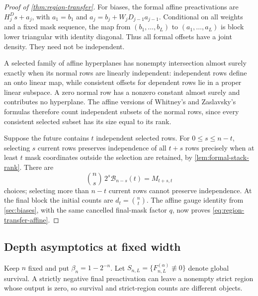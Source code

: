 \begin{proof}[Proof of \cref{thm:region-transfer}]
For biases, the formal affine preactivations are $H_j^Ds+a_j$, with $a_1=b_1$ and $a_j=b_j+W_jD_{j-1}a_{j-1}$. Conditional on all weights and a fixed mask sequence, the map from $(b_1,\ldots,b_L)$ to $(a_1,\ldots,a_L)$ is block lower triangular with identity diagonal. Thus all formal offsets have a joint density. They need not be independent.

A selected family of affine hyperplanes has nonempty intersection almost surely exactly when its normal rows are linearly independent: independent rows define an onto linear map, while consistent offsets for dependent rows lie in a proper linear subspace. A zero normal row has a nonzero constant almost surely and contributes no hyperplane. The affine versions of Whitney's and Zaslavsky's formulas therefore count independent subsets of the normal rows, since every consistent selected subset has its size equal to its rank.

Suppose the future contains $t$ independent selected rows. For $0\le s\le n-t$, selecting $s$ current rows preserves independence of all $t+s$ rows precisely when at least $t$ mask coordinates outside the selection are retained, by \cref{lem:formal-stack-rank}. There are
\[
\binom ns\,2^s\mathcal B_{n-s}(t)=M_{t+s,t}
\]
choices; selecting more than $n-t$ current rows cannot preserve independence. At the final block the initial counts are $d_t=\binom nt$. The affine gauge identity from \cref{sec:biases}, with the same cancelled final-mask factor $q$, now proves \cref{eq:region-transfer-affine}.
\end{proof}

\subsection{Depth asymptotics at fixed width}
\label{sec:fixed-width-depth}

Keep $n$ fixed and put $\beta_n=1-2^{-n}$. Let $S_{n,L}=\{F^{(\alpha)}_{n,L}\not\equiv0\}$ denote global survival. A strictly negative final preactivation can leave a nonempty strict region whose output is zero, so survival and strict-region counts are different objects.

